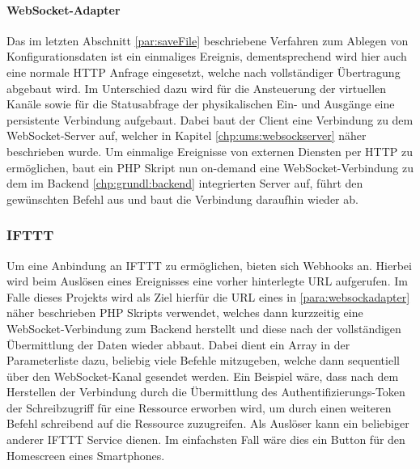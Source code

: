 \paragraph{WebSocket-Adapter}\label{para:websockadapter}
Das im letzten Abschnitt \ref {par:saveFile} beschriebene Verfahren zum Ablegen von Konfigurationsdaten ist ein einmaliges Ereignis, dementsprechend wird hier auch eine normale HTTP Anfrage eingesetzt, welche nach vollständiger Übertragung abgebaut wird. Im Unterschied dazu wird für die Ansteuerung der virtuellen Kanäle sowie für die Statusabfrage der physikalischen Ein- und Ausgänge eine persistente Verbindung aufgebaut. Dabei baut der Client eine Verbindung zu dem WebSocket-Server auf, welcher in Kapitel \ref{chp:ums:websockserver} näher beschrieben wurde. Um einmalige Ereignisse von externen Diensten per HTTP zu ermöglichen, baut ein PHP Skript nun on-demand eine WebSocket-Verbindung zu dem im Backend \ref{chp:grundl:backend} integrierten Server auf, führt den gewünschten Befehl aus und baut die Verbindung daraufhin wieder ab. 

\subsubsection{IFTTT}
Um eine Anbindung an IFTTT zu ermöglichen, bieten sich Webhooks an. Hierbei wird beim Auslösen eines Ereignisses eine vorher hinterlegte URL aufgerufen. Im Falle dieses Projekts wird als Ziel hierfür die URL eines in \autoref{para:websockadapter} näher beschrieben PHP Skripts verwendet, welches dann kurzzeitig eine WebSocket-Verbindung zum Backend herstellt und diese nach der vollständigen Übermittlung der Daten wieder abbaut. Dabei dient ein Array in der Parameterliste dazu, beliebig viele Befehle mitzugeben, welche dann sequentiell über den WebSocket-Kanal gesendet werden. Ein Beispiel wäre, dass nach dem Herstellen der Verbindung durch die Übermittlung des Authentifizierungs-Token der Schreibzugriff für eine Ressource erworben wird, um durch einen weiteren Befehl schreibend auf die Ressource zuzugreifen. Als Auslöser kann ein beliebiger anderer IFTTT Service dienen. Im einfachsten Fall wäre dies ein Button für den Homescreen eines Smartphones.  



\clearpage


